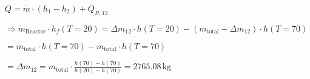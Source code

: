 \( Q = \dot{m} \cdot (h_{1} - h_{2}) + Q_{R,12} \)  

\( \Rightarrow \dot{m}_{\text{Reactor}} \cdot h_{f}(T = 20) = \Delta m_{12} \cdot h(T = 20) - (m_{\text{total}} - \Delta m_{12}) \cdot h(T = 70) \)  

\( = m_{\text{total}} \cdot h(T = 70) - m_{\text{total}} \cdot h(T = 70) \)  

\( = \Delta m_{12} = m_{\text{total}} \cdot \frac{h(70) - h(70)}{h(20) - h(70)} = 2765.08 \, \text{kg} \)